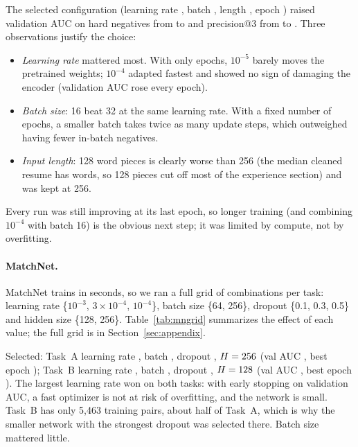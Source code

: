 \documentclass[11pt,a4paper]{article}
\begin{document}
The selected configuration (learning rate \BiBestLr, batch \BiBestBs, length \BiBestLen, epoch
\BiBestEpoch) raised validation AUC on hard negatives from \BiPreAucHard to \BiAucHard and
precision@3 from \BiPrePthree to \BiPthree. Three observations justify the choice:
\begin{itemize}
\item \emph{Learning rate} mattered most. With only \BiEpochs epochs, $10^{-5}$ barely moves the
pretrained weights; $10^{-4}$ adapted fastest and showed no sign of damaging the encoder (validation
AUC rose every epoch).
\item \emph{Batch size}: 16 beat 32 at the same learning rate. With a fixed number of epochs, a
smaller batch takes twice as many update steps, which outweighed having fewer in-batch negatives.
\item \emph{Input length}: 128 word pieces is clearly worse than 256 (the median cleaned resume has
\MedWordsRes words, so 128 pieces cut off most of the experience section) and was kept at 256.
\end{itemize}
Every run was still improving at its last epoch, so longer training (and combining
$10^{-4}$ with batch 16) is the obvious next step; it was limited by compute, not by overfitting.

\paragraph{MatchNet.} MatchNet trains in seconds, so we ran a full grid of \MnRuns combinations
per task: learning rate \{$10^{-3}$, $3\times10^{-4}$, $10^{-4}$\}, batch size \{64, 256\}, dropout
\{0.1, 0.3, 0.5\} and hidden size \{128, 256\}. Table~\ref{tab:mngrid} summarizes the effect of each
value; the full grid is in Section~\ref{sec:appendix}.



Selected: Task~A learning rate \MnALr, batch \MnABs, dropout \MnADrop, $H = 256$
(val AUC \MnAValAuc, best epoch \MnAEpoch); Task~B learning rate \MnBLr, batch \MnBBs, dropout
\MnBDrop, $H = 128$ (val AUC \MnBValAuc, best epoch \MnBEpoch). The largest learning rate
won on both tasks: with early stopping on validation AUC, a fast optimizer is not at risk of
overfitting, and the network is small. Task~B has only 5,463 training pairs, about half of Task~A,
which is why the smaller network with the strongest dropout was selected there. Batch size
mattered little.
\end{document}
